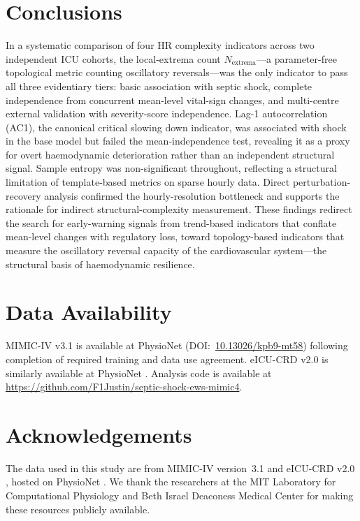 \documentclass[12pt,a4paper]{article}
\begin{document}
\section{Conclusions}
\label{sec:conclusions}

In a systematic comparison of four HR complexity indicators across two
independent ICU cohorts, the local-extrema count $N_{\text{extrema}}$---a
parameter-free topological metric counting oscillatory reversals---was the
only indicator to pass all three evidentiary tiers: basic association with
septic shock, complete independence from concurrent mean-level vital-sign
changes, and multi-centre external validation with severity-score independence.
Lag-1 autocorrelation (AC1), the canonical critical slowing down indicator,
was associated with shock in the base model but failed the mean-independence
test, revealing it as a proxy for overt haemodynamic deterioration rather than
an independent structural signal.
Sample entropy was non-significant throughout, reflecting a structural
limitation of template-based metrics on sparse hourly data.
Direct perturbation-recovery analysis confirmed the hourly-resolution
bottleneck and supports the rationale for indirect structural-complexity
measurement.
These findings redirect the search for early-warning signals from
trend-based indicators that conflate mean-level changes with regulatory
loss, toward topology-based indicators that measure the oscillatory
reversal capacity of the cardiovascular system---the structural basis of
haemodynamic resilience.

\section*{Data Availability}
MIMIC-IV v3.1 is available at PhysioNet (DOI:~\href{https://doi.org/10.13026/kpb9-mt58}{10.13026/kpb9-mt58}) following completion of required training and data use agreement. eICU-CRD v2.0 is similarly available at PhysioNet \citep{pollard2018}.
Analysis code is available at \url{https://github.com/F1Justin/septic-shock-ews-mimic4}.

\section*{Acknowledgements}
The data used in this study are from MIMIC-IV version~3.1
\citep{johnson2024mimiciv} and eICU-CRD v2.0 \citep{pollard2018},
hosted on PhysioNet \citep{goldberger2000}.
We thank the researchers at the MIT Laboratory for Computational Physiology
and Beth Israel Deaconess Medical Center for making these resources publicly
available.
\end{document}
